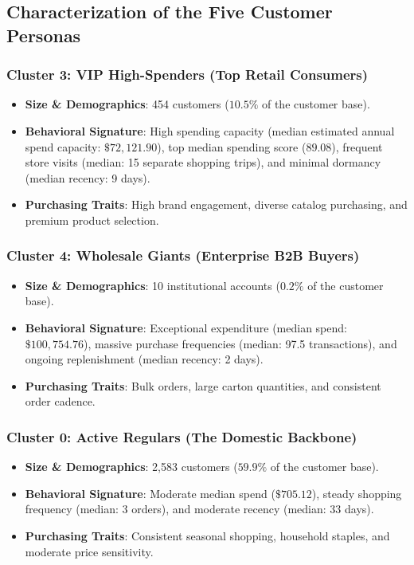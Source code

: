\documentclass[11pt,a4paper]{article}
\begin{document}
\subsection{Characterization of the Five Customer Personas}

\subsubsection{Cluster 3: VIP High-Spenders (Top Retail Consumers)}
\begin{itemize}[leftmargin=*]
    \item \textbf{Size \& Demographics}: 454 customers ($10.5\%$ of the customer base).
    \item \textbf{Behavioral Signature}: High spending capacity (median estimated annual spend capacity: $\$72,121.90$), top median spending score ($89.08$), frequent store visits (median: 15 separate shopping trips), and minimal dormancy (median recency: 9 days).
    \item \textbf{Purchasing Traits}: High brand engagement, diverse catalog purchasing, and premium product selection.
\end{itemize}

\subsubsection{Cluster 4: Wholesale Giants (Enterprise B2B Buyers)}
\begin{itemize}[leftmargin=*]
    \item \textbf{Size \& Demographics}: 10 institutional accounts ($0.2\%$ of the customer base).
    \item \textbf{Behavioral Signature}: Exceptional expenditure (median spend: $\$100,754.76$), massive purchase frequencies (median: 97.5 transactions), and ongoing replenishment (median recency: 2 days).
    \item \textbf{Purchasing Traits}: Bulk orders, large carton quantities, and consistent order cadence.
\end{itemize}

\subsubsection{Cluster 0: Active Regulars (The Domestic Backbone)}
\begin{itemize}[leftmargin=*]
    \item \textbf{Size \& Demographics}: 2,583 customers ($59.9\%$ of the customer base).
    \item \textbf{Behavioral Signature}: Moderate median spend ($\$705.12$), steady shopping frequency (median: 3 orders), and moderate recency (median: 33 days).
    \item \textbf{Purchasing Traits}: Consistent seasonal shopping, household staples, and moderate price sensitivity.
\end{itemize}
\end{document}
